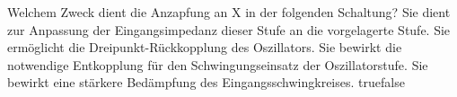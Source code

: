     {Welchem Zweck dient die Anzapfung an X in der folgenden Schaltung?}
    {Sie dient zur Anpassung der Eingangsimpedanz dieser Stufe an die vorgelagerte Stufe.}
    {Sie ermöglicht die Dreipunkt-Rückkopplung des Oszillators.}
    {Sie bewirkt die notwendige Entkopplung für den Schwingungseinsatz der Oszillatorstufe.}
    {Sie bewirkt eine stärkere Bedämpfung des Eingangsschwingkreises.}
    {true}{false}